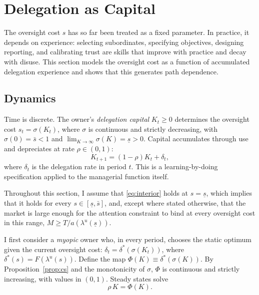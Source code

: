 \documentclass[11pt,a4paper]{article}
\theoremstyle{plain}
\begin{document}
\section{Delegation as Capital}\label{sec:dynamics}

The oversight cost $s$ has so far been treated as a fixed parameter. In practice, it depends on experience: selecting subordinates, specifying objectives, designing reporting, and calibrating trust are skills that improve with practice and decay with disuse. This section models the oversight cost as a function of accumulated delegation experience and shows that this generates path dependence.

\subsection{Dynamics}

Time is discrete. The owner's \emph{delegation capital} $K_t \ge 0$ determines the oversight cost $s_t = \sigma(K_t)$, where $\sigma$ is continuous and strictly decreasing, with $\sigma(0) = \bar s < 1$ and $\lim_{K \to \infty} \sigma(K) = \underline s > 0$. Capital accumulates through use and depreciates at rate $\rho \in (0, 1)$:
\begin{equation}\label{eq:K}
  K_{t+1} = (1 - \rho) K_t + \delta_t,
\end{equation}
where $\delta_t$ is the delegation rate in period $t$. This is a learning-by-doing specification \citep{arrow1962} applied to the managerial function itself.

Throughout this section, I assume that \eqref{eq:interior} holds at $s = \underline s$, which implies that it holds for every $s \in [\underline s, \bar s]$, and, except where stated otherwise, that the market is large enough for the attention constraint to bind at every oversight cost in this range, $M \ge T / a(\lambda^u(\underline s))$.

I first consider a \emph{myopic} owner who, in every period, chooses the static optimum given the current oversight cost: $\delta_t = \delta^*(\sigma(K_t))$, where $\delta^*(s) = F(\lambda^u(s))$. Define the map $\Phi(K) \equiv \delta^*(\sigma(K))$. By Proposition~\ref{prop:cs} and the monotonicity of $\sigma$, $\Phi$ is continuous and strictly increasing, with values in $(0, 1)$. Steady states solve
\begin{equation}\label{eq:steady}
  \rho \, K = \Phi(K).
\end{equation}
\end{document}
